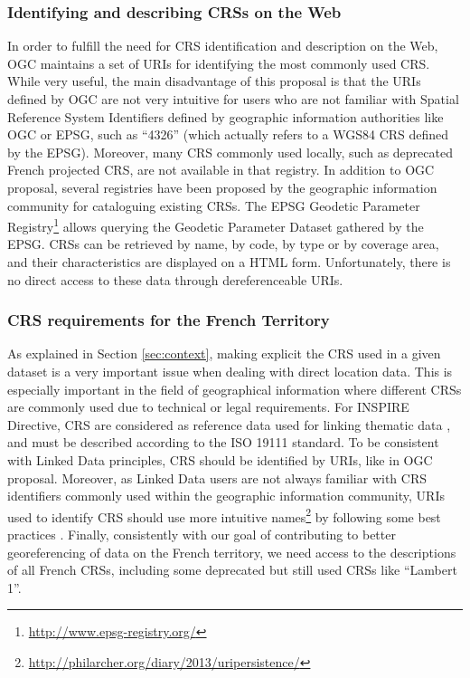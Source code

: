 \subsubsection{Identifying and describing CRSs on the Web}
In order to fulfill the need for CRS identification and description on the Web, OGC maintains a set of URIs for identifying the most commonly used CRS. While very useful, the main disadvantage of this proposal is that the URIs defined by OGC are not very intuitive for users who are not familiar with Spatial Reference System Identifiers defined by geographic information authorities like OGC or EPSG, such as ``4326'' (which actually refers to a WGS84 CRS defined by the EPSG). Moreover, many CRS commonly used locally, such as deprecated French projected CRS, are not available in that registry. In addition to OGC proposal, several registries have been proposed by the geographic information community for cataloguing existing CRSs.
The EPSG Geodetic Parameter Registry\footnote{\url{http://www.epsg-registry.org/}} allows querying the Geodetic Parameter Dataset gathered by the EPSG. CRSs can be retrieved by name, by code, by type or by coverage area, and their characteristics are displayed on a HTML form. Unfortunately, there is no direct access to these data through dereferenceable URIs.

\subsubsection{CRS requirements for the  French Territory} \label{sec:reqs}

As explained in Section \ref{sec:context}, making explicit the CRS used in a given dataset is a very important issue when dealing with direct location data. This is especially important in the field of geographical information where different CRSs are commonly used due to technical or legal requirements. For INSPIRE Directive, CRS are considered as reference data used for linking thematic data \cite{inspire2009}, and must be described according to the ISO 19111 standard. To be consistent with Linked Data principles, CRS should be identified by URIs, like in OGC proposal. Moreover, as Linked Data users are not always familiar with CRS identifiers commonly used within the geographic information community, URIs used to identify CRS should use more intuitive names\footnote{\url{http://philarcher.org/diary/2013/uripersistence/}} by following some best practices \cite{isaURI}. Finally, consistently with our goal of contributing to better georeferencing of data on the French territory, we need access to the descriptions of all French CRSs, including some deprecated but still used CRSs like ``Lambert 1''.

